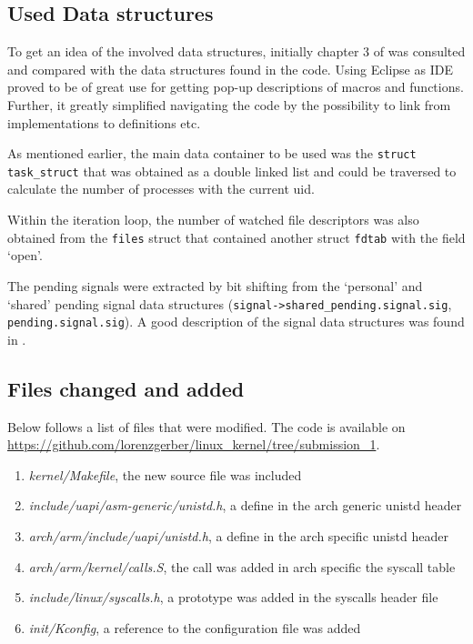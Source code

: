 \documentclass[a4paper,11pt,twoside]{article}
\begin{document}
\subsection{Used Data structures}
To get an idea of the involved data structures, initially chapter 3 of
\cite{bovetcesati2005} was consulted and compared with the data structures found
in the code. Using Eclipse as IDE proved to be of great use for getting pop-up
descriptions of macros and functions. Further, it greatly simplified navigating
the code by the possibility to link from implementations to definitions etc.

As mentioned earlier, the main data container to be used was the
\verb+struct task_struct+ that was obtained as a double linked list and could be
traversed to calculate the number of processes with the current uid.

Within the iteration loop, the number of watched file descriptors was also
obtained from the \verb+files+ struct that contained another struct \verb+fdtab+
with the field `open'.

The pending signals were extracted by bit shifting from the `personal' and `shared'
pending signal data structures (\verb+signal->shared_pending.signal.sig+,
\verb+pending.signal.sig+). A good description of the signal data structures was
found in \cite{love2010}.


\subsection{Files changed and added}
Below follows a list of files that were modified. The code is available on
\url{https://github.com/lorenzgerber/linux_kernel/tree/submission_1}.
\begin{enumerate}
  \item \textit{kernel/Makefile}, the new source file was included
  \item \textit{include/uapi/asm-generic/unistd.h}, a define in the arch generic
  unistd header
  \item \textit{arch/arm/include/uapi/unistd.h}, a define in the arch specific
  unistd header
  \item \textit{arch/arm/kernel/calls.S}, the call was added in arch specific
  the syscall table
  \item \textit{include/linux/syscalls.h}, a prototype was added in the syscalls
  header file
  \item \textit{init/Kconfig}, a reference to the configuration file was added
\end{enumerate}
\end{document}
